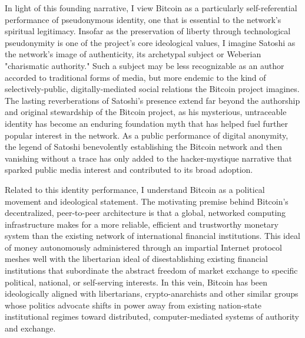 In light of this founding narrative, I view Bitcoin as a particularly self-referential performance of pseudonymous identity, one that is essential to the network's spiritual legitimacy. Insofar as the preservation of liberty through technological pseudonymity is one of the project's core ideological values, I imagine Satoshi as the network's image of authenticity, its archetypal subject or Weberian "charismatic authority." Such a subject may be less recognizable as an author accorded to traditional forms of media, but more endemic to the kind of selectively-public, digitally-mediated social relations the Bitcoin project imagines. The lasting reverberations of Satoshi's presence extend far beyond the authorship and original stewardship of the Bitcoin project, as his mysterious, untraceable identity has become an enduring foundation myth that has helped fuel further popular interest in the network. As a public performance of digital anonymity, the legend of Satoshi benevolently establishing the Bitcoin network and then vanishing without a trace has only added to the hacker-mystique narrative that sparked public media interest and contributed to its broad adoption.

Related to this identity performance, I understand Bitcoin as a political movement and ideological statement. The motivating premise behind Bitcoin's decentralized, peer-to-peer architecture is that a global, networked computing infrastructure makes for a more reliable, efficient and trustworthy monetary system than the existing network of international financial institutions. This ideal of money autonomously administered through an impartial Internet protocol meshes well with the libertarian ideal of disestablishing existing financial institutions that subordinate the abstract freedom of market exchange to specific political, national, or self-serving interests. In this vein, Bitcoin has been ideologically aligned with libertarians, crypto-anarchists and other similar groups whose politics advocate shifts in power away from existing nation-state institutional regimes toward distributed, computer-mediated systems of authority and exchange.

